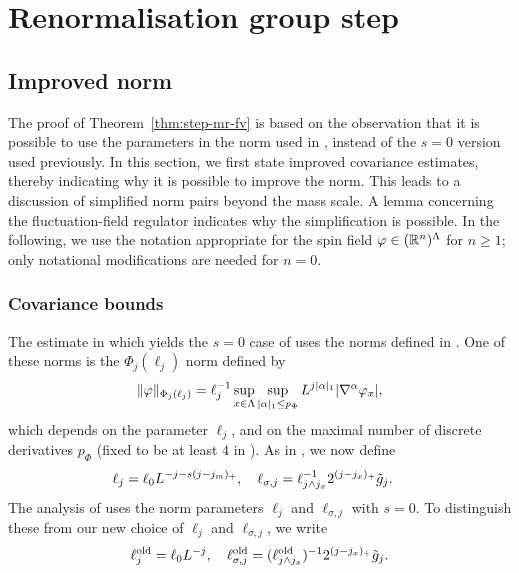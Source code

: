 \chapter{Renormalisation group step}


\section{Improved norm}
\label{sec:Rpf1}

The proof of Theorem~\ref{thm:step-mr-fv} is based on the observation that
it is possible to use the parameters 
in the norm used in \cite{BS-rg-IE}, instead of the $s=0$ version used
previously.  In this section, we first
state improved covariance estimates, thereby indicating why it is possible
to improve the norm.
This leads to a discussion of simplified norm pairs beyond the mass
scale.  A lemma concerning the fluctuation-field regulator indicates why the
simplification is possible.
In the following, we use the notation appropriate for the spin field
$\varphi \in ({\mathbb R}^n)^\Lambda$ for $n \ge 1$; only notational modifications are needed for
$n=0$.


\subsection{Covariance bounds}
\label{sec:Cbds}

The estimate in \cite{ST-phi4} which yields the $s = 0$ case of 
uses the norms defined in \cite{BS-rg-IE}.
One of these norms is the $\Phi_j(\ell_j)$ norm defined by
\begin{equation}
\lbeq{phinorm}
\|\varphi\|_{\Phi_j(\ell_j)}
=
\ell_j^{-1}
\sup_{x\in \Lambda}
\sup_{|\alpha|_1  \le p_\Phi}
L^{j|\alpha|_1}
|\nabla^{\alpha} \varphi_x|,
\end{equation}
which depends on the parameter $\ell_j$,
and on the maximal number of discrete derivatives $p_\Phi$
(fixed to be at least $4$ in \cite{BS-rg-IE}).
As in , we now define
\begin{align}
\label{e:elldef}
\ell_j &= \ell_0 L^{-j - s (j - j_m)_+}, \quad
\ell_{\sigma,j}
=
\ell_{j \wedge j_{x}}^{-1} 2^{(j - j_{x})_+} \tilde{g}_j.
\end{align}
The analysis of \cite{BS-rg-IE,BS-rg-step} uses the norm parameters $\ell_j$ and $\ell_{\sigma,j}$ with $s = 0$.
To distinguish these from our
new choice  of $\ell_j$ and $\ell_{\sigma,j}$, we write
\begin{equation}
\label{e:ell-old}
    \ell_j^{\mathrm{old}} = \ell_0 L^{-j},
    \quad
    \ell_{\sigma,j}^{\mathrm{old}}  =
    (\ell_{j \wedge j_{x}}^{\rm old})^{-1}2^{(j - j_{x})_+}\tilde{g}_j.
\end{equation}

